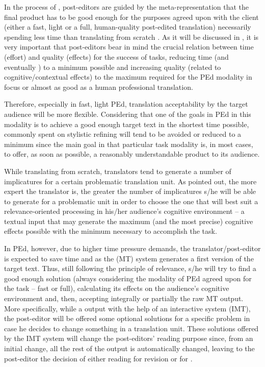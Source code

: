 \documentclass[output=paper]{langsci/langscibook}
\begin{document}
In the process of , post-editors are guided by the meta-re\-presenta\-tion that the final product has to be good enough for the purposes agreed upon with the client (either a fast, light or a full, human-quality post-edited translation) necessarily spending less time than translating from scratch \citep[cf.][]{Carl2014process, sanchis2014interactive}. As it will be discussed in , it is very important that post-editors bear in mind the crucial relation between time (effort) and quality (effects) for the success of  tasks, reducing time (and eventually ) to a minimum possible and increasing quality (related to cognitive/contextual effects) to the maximum required for the PEd modality in focus or almost as good as a human professional translation.



Therefore, especially in fast, light PEd, translation acceptability by the target audience will be more flexible. Considering that one of the goals in PEd in this modality is to achieve a good enough target text in the shortest time possible,  commonly spent on stylistic refining will tend to be avoided or reduced to a minimum since the main goal in that particular task modality is, in most cases, to offer, as soon as possible, a reasonably understandable product to its audience. 



While translating from scratch, translators tend to generate a number of implicatures for a certain problematic translation unit. As \citet{alves2007modelling} pointed out, the more expert the translator is, the greater the number of implicatures s/he will be able to generate for a problematic unit in order to choose the one that will best suit a relevance-oriented processing in his/her audience's cognitive environment -- a textual input that may generate the maximum (and the most precise) cognitive effects possible with the minimum  necessary to accomplish the task. 



In PEd, however, due to higher time pressure demands, the translator/post-editor is expected to save time and  as the  (MT) system generates a first version of the target text. Thus, still following the principle of relevance, s/he will try to find a good enough solution (always considering the modality of PEd agreed upon for the task -- fast or full), calculating its effects on the audience's cognitive environment and, then, accepting integrally or partially the raw MT output. More specifically, while  a  output with the help of an interactive system (IMT), the post-editor will be offered some optional solutions for a specific problem in case he decides to change something in a translation unit. These solutions offered by the IMT system will change the post-editors' reading purpose since, from an initial change, all the rest of the output is automatically changed, leaving to the post-editor the decision of either reading for revision or  for . 
\end{document}
